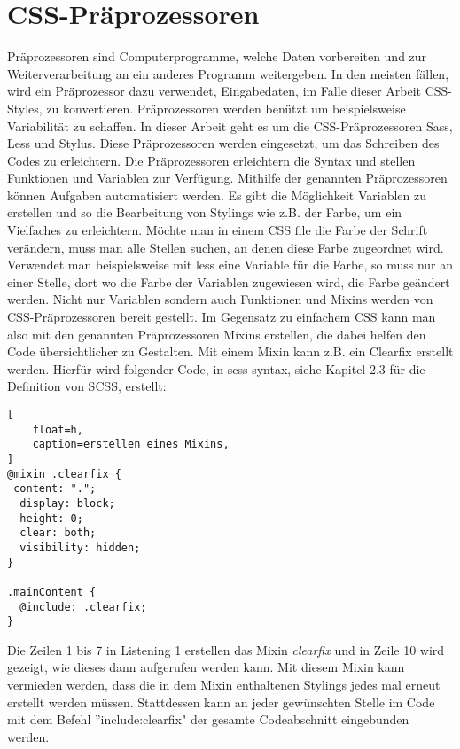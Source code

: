 \section{CSS-Präprozessoren}
Präprozessoren sind Computerprogramme, welche Daten vorbereiten und zur Weiterverarbeitung an ein anderes Programm weitergeben. In den meisten fällen, wird ein Präprozessor dazu verwendet, Eingabedaten, im Falle dieser Arbeit CSS-Styles, zu konvertieren.\autocite[]{Peter.2012}\newline
Präprozessoren werden benützt um beispielsweise Variabilität zu schaffen.
In dieser Arbeit geht es um die CSS-Präprozessoren Sass, Less und Stylus. Diese Präprozessoren werden eingesetzt, um das Schreiben des Codes zu erleichtern. Die Präprozessoren erleichtern die Syntax und stellen Funktionen und Variablen zur Verfügung. \newline
Mithilfe der genannten Präprozessoren können Aufgaben automatisiert werden. Es gibt die Möglichkeit Variablen zu erstellen und so die Bearbeitung von Stylings wie z.B. der Farbe, um ein Vielfaches zu erleichtern. Möchte man in einem CSS file die Farbe der Schrift verändern, muss man alle Stellen suchen, an denen diese Farbe zugeordnet wird. Verwendet man beispielsweise mit less eine Variable für die Farbe, so muss nur an einer Stelle, dort wo die Farbe der Variablen zugewiesen wird, die Farbe geändert werden.\newline
Nicht nur Variablen sondern auch Funktionen und Mixins werden von CSS-Präprozessoren bereit gestellt. Im Gegensatz zu einfachem CSS kann man also mit den genannten Präprozessoren Mixins erstellen, die dabei helfen den Code übersichtlicher zu Gestalten. Mit einem Mixin kann z.B. ein Clearfix erstellt werden. Hierfür wird folgender Code, in scss syntax, siehe Kapitel 2.3 für die Definition von SCSS, erstellt:
\begin{lstlisting}[
	float=h,
	caption=erstellen eines Mixins,
]
@mixin .clearfix {
 content: ".";
  display: block;
  height: 0;
  clear: both;
  visibility: hidden;
}

.mainContent {
  @include: .clearfix;
}
\end{lstlisting}
\newline
Die Zeilen 1 bis 7 in Listening 1 erstellen das Mixin \textit{clearfix} und in Zeile 10 wird gezeigt, wie dieses dann aufgerufen werden kann. Mit diesem Mixin kann vermieden werden, dass die in dem Mixin enthaltenen Stylings jedes mal erneut erstellt werden müssen. Stattdessen kann an jeder gewünschten Stelle im Code mit dem Befehl ''include:clearfix" der gesamte Codeabschnitt eingebunden werden.

